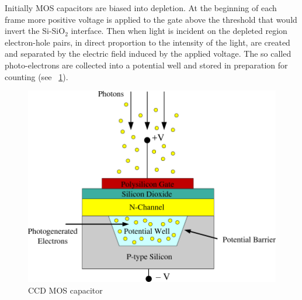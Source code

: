 Initially MOS capacitors are biased into depletion.
%
At the beginning of each frame more positive voltage is applied to the gate above the threshold that would invert the Si-SiO$_2$ interface.
%
Then when light is incident on the depleted region electron-hole pairs, in direct proportion to the intensity of the light, are created and separated by the electric field induced by the applied voltage.
%
The so called photo-electrons are collected into a potential well and stored in preparation for counting (see ~\ref{fig:ccd-mos}).
\begin{figure}
    \includegraphics[width=\linewidth,keepaspectratio]{figures/potential_well.png}
    \caption{CCD MOS capacitor\cite{Chun2010AHV}}
    \label{fig:ccd-mos}
\end{figure}

%
%


